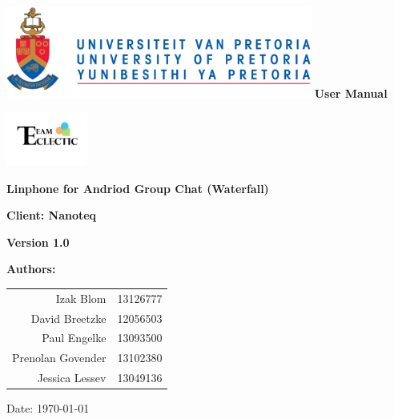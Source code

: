 \begin{titlepage}
\begin{flushright}

\includegraphics[width=380px]{../global/University_of_Pretoria_Logo.png}
\newline
\newline
\textbf {\LARGE User Manual} \newline


\centering\includegraphics[width=100px]{../global/Logo.jpg}

\begin{flushleft}
\textbf {\Large Linphone for Andriod Group Chat (Waterfall)}\newline

\textbf {\Large Client: Nanoteq}\newline


\textbf {\large Version 1.0}\newline
\end{flushleft}
\centering \textbf {\large Authors:}

\begin{table}[H]
\large
\centering
\begin{tabular}{rl}
	Izak Blom & 13126777 \\
	David Breetzke & 12056503 \\
	Paul Engelke & 13093500 \\
	Prenolan Govender & 13102380 \\
	Jessica Lessev & 13049136 \\
\end{tabular}
\end{table}

Date: \today

\end{flushright}
\end{titlepage}